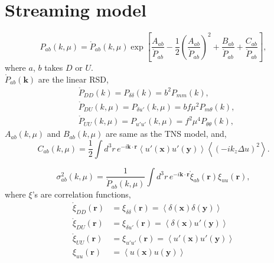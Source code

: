 \documentclass[a4paper,11pt, fleqn]{article}
\begin{document}
%
%
\newpage
\section{Streaming model}
\vspace{-5mm}

\begin{equation}
  P_{ab}(k, \mu) = \mathring{P}_{ab}(k, \mu) \exp \left[
    \frac{A_{ab}}{\mathring{P}_{ab}}
    - \frac{1}{2} \left( \frac{A_{ab}}{\mathring{P}_{ab}} \right)^2
    + \frac{B_{ab}}{\mathring{P}_{ab}}
    + \frac{C_{ab}}{\mathring{P}_{ab}}
    \right],
\end{equation}
%
where $a$, $b$ takes $D$ or $U$.\\

$\mathring{P}_{ab}(\bm{k})$ are the linear RSD,
%
\begin{align}
  &\mathring{P}_{DD}(k) = P_{\delta\delta}(k) = b^2 P_{mm}(k),\\
  &\mathring{P}_{DU}(k, \mu) = P_{\delta u'}(k, \mu) = b f\mu^2 P_{m\theta}(k),\\
  &\mathring{P}_{UU}(k, \mu) = P_{u'u'}(k, \mu) = f^2\mu^4 P_{\theta\theta}(k),
\end{align}
%
$A_{ab}(k, \mu)$ and $B_{ab}(k, \mu)$ are same as the TNS model, and,
%
\begin{equation}
  C_{ab}(k, \mu) =
  \frac{1}{2} \int\!\! d^3 r \, e^{-i\bm{k}\cdot\bm{r}}
  \left\langle u'(\bm{x}) u'(\bm{y}) \right\rangle
  \left\langle (-ik_z \Delta u )^2 \right\rangle.
\end{equation}

%
\begin{equation}
  \sigma_{ab}^2(k, \mu) = \frac{1}{\mathring{P}_{ab}(k, \mu)}
  \int \!\! d^3 r \, e^{-i\bm{k}\cdot\bm{r}} 
  \mathring{\xi}_{ab}(\bm{r}) \xi_{uu}(\bm{r}),
\end{equation}
%
where $\xi$'s are correlation functions,
%
\begin{align}
  \mathring{\xi}_{DD}(\bm{r}) &= \xi_{\delta\delta}(\bm{r}) = \left\langle
  \delta(\bm{x}) \delta(\bm{y}) \right\rangle\\
  \mathring{\xi}_{DU}(\bm{r}) &= \xi_{\delta u'}(\bm{r}) = \left\langle
  \delta(\bm{x}) u'(\bm{y}) \right\rangle\\
  \mathring{\xi}_{UU}(\bm{r}) &= \xi_{u'u'}(\bm{r}) = \left\langle
  u'(\bm{x}) u'(\bm{y}) \right\rangle\\
  \xi_{uu}(\bm{r}) &= \left\langle
  u(\bm{x}) u(\bm{y}) \right\rangle\\
\end{align}
  
\end{document}
